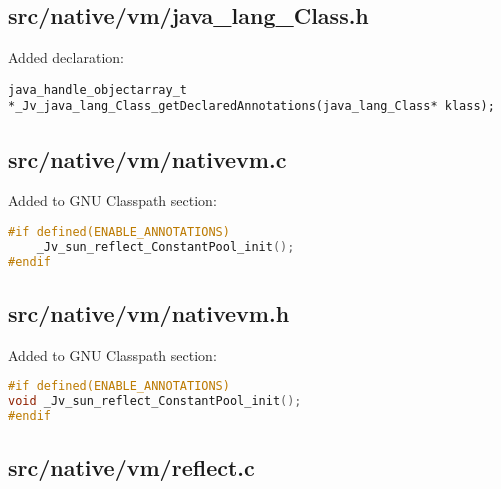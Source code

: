 \documentclass[a4paper, 10pt, titlepage]{scrartcl} %
\begin{document}
\subsection{src/native/vm/java\_lang\_Class.h}
\label{sec:src/native/vm/java_lang_Class.h}

Added declaration: \begin{scriptsize}\verb|java_handle_objectarray_t|\hspace{0.0pt}\verb| |\hspace{0.0pt}\verb||\hspace{0.0pt}\verb|*|\hspace{0.0pt}\verb|_Jv_java_lang_Class_getDeclaredAnnotations|\hspace{0.0pt}\verb|(|\hspace{0.0pt}\verb|java_lang_Class|\hspace{0.0pt}\verb|*|\hspace{0.0pt}\verb||\hspace{0.0pt}\verb| |\hspace{0.0pt}\verb|klass|\hspace{0.0pt}\verb|)|\hspace{0.0pt}\verb||\hspace{0.0pt}\verb|;|\hspace{0.0pt}\verb||\end{scriptsize}

\subsection{src/native/vm/nativevm.c}
\label{sec:src/native/vm/nativevm.c}

Added to GNU Classpath section:
\begin{lstlisting}[language=C,firstnumber=90]
#if defined(ENABLE_ANNOTATIONS)
	_Jv_sun_reflect_ConstantPool_init();
#endif
\end{lstlisting}

\subsection{src/native/vm/nativevm.h}
\label{sec:src/native/vm/nativevm.h}

Added to GNU Classpath section:
\begin{lstlisting}[language=C,firstnumber=69]
#if defined(ENABLE_ANNOTATIONS)
void _Jv_sun_reflect_ConstantPool_init();
#endif
\end{lstlisting}

\subsection{src/native/vm/reflect.c}
\label{sec:src/native/vm/reflect.c}
\end{document}

